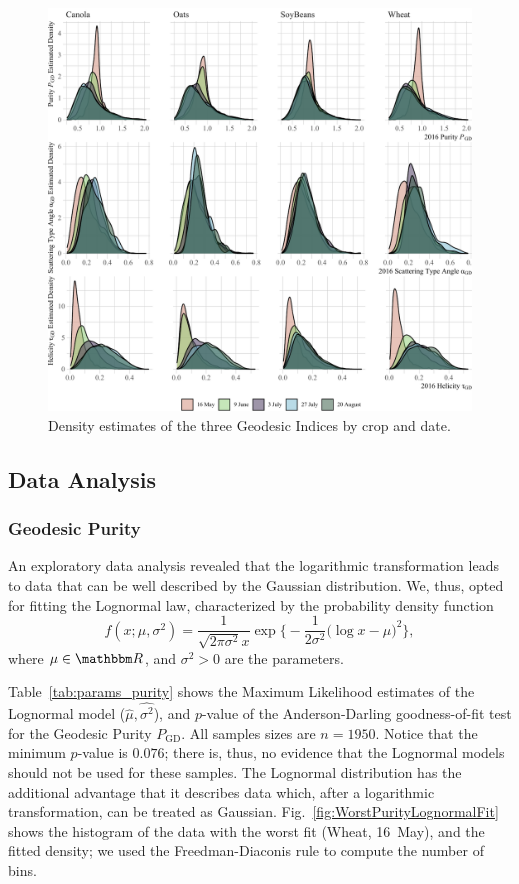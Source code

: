 \documentclass[journal]{IEEEtran}
\begin{document}
	\begin{figure}[htb]
		\centering
		\includegraphics[width=\linewidth]{Indexes}
		\caption{Density estimates of the three Geodesic Indices by crop and date.}\label{fig:AllIndexes}
	\end{figure}
	
	\subsection{Data Analysis}
	
	\subsubsection{Geodesic Purity}
	
	An exploratory data analysis revealed that the logarithmic transformation leads to data that can be well described by the Gaussian distribution.
	We, thus, opted for fitting the Lognormal law, characterized by the probability density function
	\begin{equation}
	f(x;\mu,\sigma^2) = \frac{1}{\sqrt{2\pi\sigma^2} x} \exp\Big\{
	-\frac1{2 \sigma^2}\big(\log x - \mu\big)^2
	\Big\},
	\end{equation}
	where $\mu\in\mathbbm R$, and $\sigma^2>0$ are the parameters.
	
	Table~\ref{tab:params_purity} shows the Maximum Likelihood estimates of the Lognormal model ($\widehat \mu,\widehat{\sigma^2}$), and $p$-value of the Anderson-Darling goodness-of-fit test for the Geodesic Purity $P_{\text{GD}}$.
	All samples sizes are $n=1950$.
	Notice that the minimum $p$-value is $0.076$; there is, thus, no evidence that the Lognormal models should not be used for these samples.
	The Lognormal distribution has the additional advantage that it describes data which, after a logarithmic transformation, can be treated as Gaussian.
	Fig.~\ref{fig:WorstPurityLognormalFit} shows the histogram of the data with the worst fit (Wheat, 16~May), and the fitted density; we used the Freedman-Diaconis rule to compute the number of bins.
	
\end{document}
